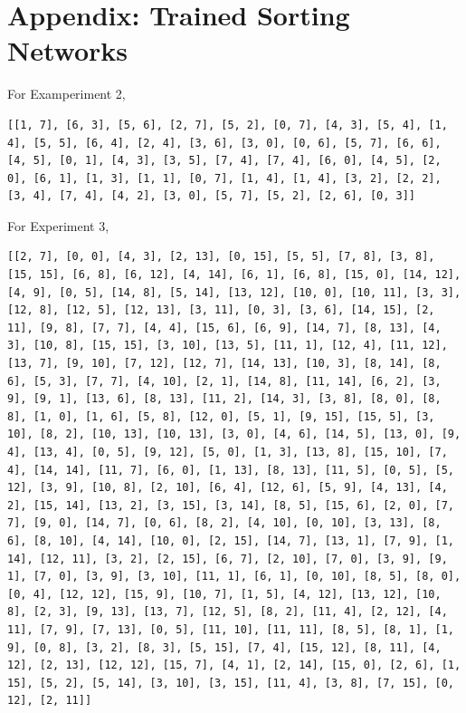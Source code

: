 \documentclass[11pt]{article}
\begin{document}
\section{Appendix: Trained Sorting Networks}

For Examperiment 2,

\begin{verbatim}
[[1, 7], [6, 3], [5, 6], [2, 7], [5, 2], [0, 7], [4, 3], [5, 4], [1,
4], [5, 5], [6, 4], [2, 4], [3, 6], [3, 0], [0, 6], [5, 7], [6, 6],
[4, 5], [0, 1], [4, 3], [3, 5], [7, 4], [7, 4], [6, 0], [4, 5], [2,
0], [6, 1], [1, 3], [1, 1], [0, 7], [1, 4], [1, 4], [3, 2], [2, 2],
[3, 4], [7, 4], [4, 2], [3, 0], [5, 7], [5, 2], [2, 6], [0, 3]]
\end{verbatim}

For Experiment 3,

\begin{verbatim}
[[2, 7], [0, 0], [4, 3], [2, 13], [0, 15], [5, 5], [7, 8], [3, 8],
[15, 15], [6, 8], [6, 12], [4, 14], [6, 1], [6, 8], [15, 0], [14, 12],
[4, 9], [0, 5], [14, 8], [5, 14], [13, 12], [10, 0], [10, 11], [3, 3],
[12, 8], [12, 5], [12, 13], [3, 11], [0, 3], [3, 6], [14, 15], [2,
11], [9, 8], [7, 7], [4, 4], [15, 6], [6, 9], [14, 7], [8, 13], [4,
3], [10, 8], [15, 15], [3, 10], [13, 5], [11, 1], [12, 4], [11, 12],
[13, 7], [9, 10], [7, 12], [12, 7], [14, 13], [10, 3], [8, 14], [8,
6], [5, 3], [7, 7], [4, 10], [2, 1], [14, 8], [11, 14], [6, 2], [3,
9], [9, 1], [13, 6], [8, 13], [11, 2], [14, 3], [3, 8], [8, 0], [8,
8], [1, 0], [1, 6], [5, 8], [12, 0], [5, 1], [9, 15], [15, 5], [3,
10], [8, 2], [10, 13], [10, 13], [3, 0], [4, 6], [14, 5], [13, 0], [9,
4], [13, 4], [0, 5], [9, 12], [5, 0], [1, 3], [13, 8], [15, 10], [7,
4], [14, 14], [11, 7], [6, 0], [1, 13], [8, 13], [11, 5], [0, 5], [5,
12], [3, 9], [10, 8], [2, 10], [6, 4], [12, 6], [5, 9], [4, 13], [4,
2], [15, 14], [13, 2], [3, 15], [3, 14], [8, 5], [15, 6], [2, 0], [7,
7], [9, 0], [14, 7], [0, 6], [8, 2], [4, 10], [0, 10], [3, 13], [8,
6], [8, 10], [4, 14], [10, 0], [2, 15], [14, 7], [13, 1], [7, 9], [1,
14], [12, 11], [3, 2], [2, 15], [6, 7], [2, 10], [7, 0], [3, 9], [9,
1], [7, 0], [3, 9], [3, 10], [11, 1], [6, 1], [0, 10], [8, 5], [8, 0],
[0, 4], [12, 12], [15, 9], [10, 7], [1, 5], [4, 12], [13, 12], [10,
8], [2, 3], [9, 13], [13, 7], [12, 5], [8, 2], [11, 4], [2, 12], [4,
11], [7, 9], [7, 13], [0, 5], [11, 10], [11, 11], [8, 5], [8, 1], [1,
9], [0, 8], [3, 2], [8, 3], [5, 15], [7, 4], [15, 12], [8, 11], [4,
12], [2, 13], [12, 12], [15, 7], [4, 1], [2, 14], [15, 0], [2, 6], [1,
15], [5, 2], [5, 14], [3, 10], [3, 15], [11, 4], [3, 8], [7, 15], [0,
12], [2, 11]]
\end{verbatim}
\end{document}
